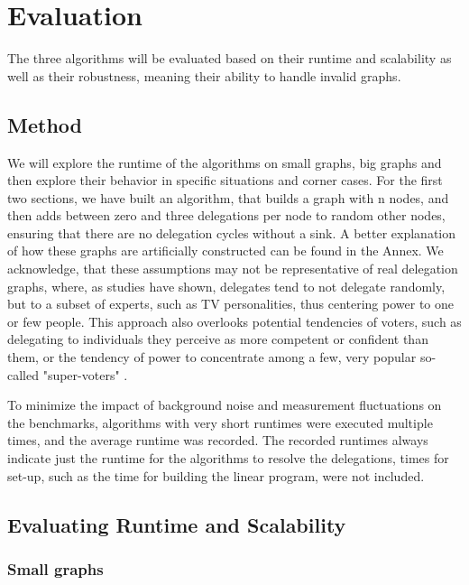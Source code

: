 \graphicspath{ {./figures/} }

\chapter{Evaluation}

The three algorithms will be evaluated based on their runtime and scalability as well as their robustness, meaning their ability to handle invalid graphs. 

\section{Method}

We will explore the runtime of the algorithms on small graphs, big graphs and then explore their behavior in specific situations and corner cases. For the first two sections, we have built an algorithm, that builds a graph with n nodes, and then adds between zero and three delegations per node to random other nodes, ensuring that there are no delegation cycles without a sink. A better explanation of how these graphs are artificially constructed can be found in the Annex.  We acknowledge, that these assumptions may not be representative of real delegation graphs, where, as studies have shown, delegates tend to not delegate randomly, but to a subset of experts, such as TV personalities, thus centering power to one or few people. This approach also overlooks potential tendencies of voters, such as delegating to individuals they perceive as more competent or confident than them, or the tendency of power to concentrate among a few, very popular so-called "super-voters" \cite{klingVotingBehaviourPower2015}.

To minimize the impact of background noise and measurement fluctuations on the benchmarks, algorithms with very short runtimes were executed multiple times, and the average runtime was recorded. The recorded runtimes always indicate just the runtime for the algorithms to resolve the delegations, times for set-up, such as the time for building the linear program, were not included. 

\section{Evaluating Runtime and Scalability}

\subsection{Small graphs}
\label{subsec:small_graphs}

